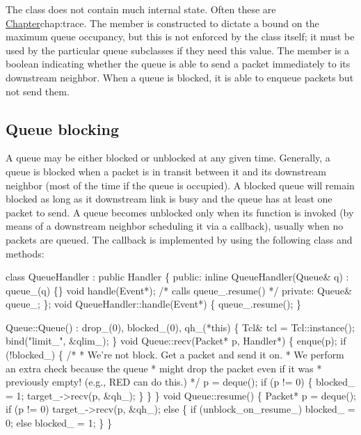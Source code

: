 The  class does not contain much internal state.
Often these are
\href{special monitoring objects}{Chapter}{chap:trace}.
The  member is constructed to dictate a bound on the maximum
queue occupancy, but this is not enforced by the  class itself; it
must be used by the particular queue subclasses if they need this value.
The  member is a boolean indicating whether the
queue is able to send a packet immediately to its downstream neighbor.
When a queue is blocked, it is able to enqueue packets but not send them.

\subsection{Queue blocking}
\label{sec:qblock}

A queue may be either blocked or unblocked at any given time.
Generally, a queue is blocked when a packet is in transit between it
and its downstream neighbor (most of the time if the queue is occupied).
A blocked queue will remain blocked as long as it downstream link is
busy and the queue has at least one packet to send.
A queue becomes unblocked only when its  function is
invoked (by means of a downstream neighbor scheduling it via
a callback), usually when no packets are queued.
The callback is implemented by using the following class and
methods:
\begin{program}
        class QueueHandler : public Handler \{
        public:
                inline QueueHandler(Queue& q) : queue_(q) \{\}
                void handle(Event*); /* calls queue_.resume() */
         private:
                Queue& queue_;
        \};
        void QueueHandler::handle(Event*)
        \{
                queue_.resume();
        \}

        Queue::Queue() : drop_(0), blocked_(0), qh_(*this)
        \{
                Tcl& tcl = Tcl::instance();
                bind("limit_", &qlim_);
        \}
        void Queue::recv(Packet* p, Handler*)
        \{
                enque(p);
                if (!blocked_) \{
                        /*
                         * We're not block.  Get a packet and send it on.
                         * We perform an extra check because the queue
                         * might drop the packet even if it was
                         * previously empty!  (e.g., RED can do this.)
                         */
                        p = deque();
                        if (p != 0) \{
                                blocked_ = 1;
                                target_->recv(p, &qh_);
                        \}
                \}
        \}
        void Queue::resume()
        \{
                Packet* p = deque();
                if (p != 0)
                        target_->recv(p, &qh_);
                else \{
                        if (unblock_on_resume_)
                                blocked_ = 0;
                        else
                                blocked_ = 1;
                \}
        \}
\end{program}
